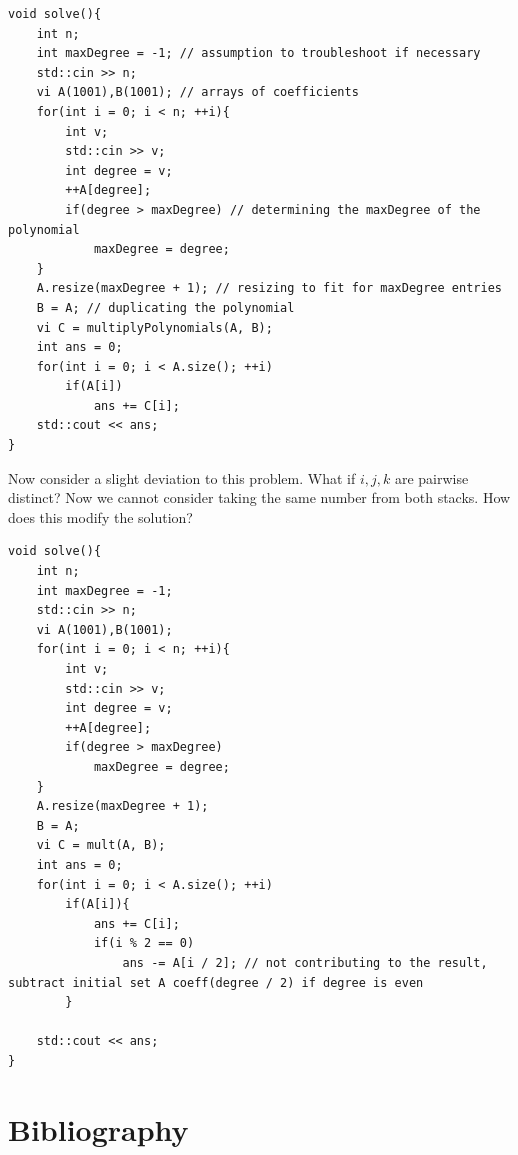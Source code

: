 \documentclass[letterpaper]{article}
\begin{document}
\begin{lstlisting}
void solve(){
    int n;
    int maxDegree = -1; // assumption to troubleshoot if necessary
    std::cin >> n;
    vi A(1001),B(1001); // arrays of coefficients
    for(int i = 0; i < n; ++i){
        int v;
        std::cin >> v;
        int degree = v;
        ++A[degree];
        if(degree > maxDegree) // determining the maxDegree of the polynomial
            maxDegree = degree;
    }
    A.resize(maxDegree + 1); // resizing to fit for maxDegree entries
    B = A; // duplicating the polynomial
    vi C = multiplyPolynomials(A, B);
    int ans = 0;
    for(int i = 0; i < A.size(); ++i)
        if(A[i])
            ans += C[i];
    std::cout << ans;
}
\end{lstlisting}

Now consider a slight deviation to this problem. What if $i,j,k$ are pairwise distinct? Now we cannot consider taking the same number from both stacks. How does this modify the solution?

\begin{lstlisting}
void solve(){
    int n;
    int maxDegree = -1;
    std::cin >> n;
    vi A(1001),B(1001);
    for(int i = 0; i < n; ++i){
        int v;
        std::cin >> v;
        int degree = v;
        ++A[degree];
        if(degree > maxDegree)
            maxDegree = degree;
    }
    A.resize(maxDegree + 1);
    B = A;
    vi C = mult(A, B);
    int ans = 0;
    for(int i = 0; i < A.size(); ++i)
        if(A[i]){
            ans += C[i];
            if(i % 2 == 0)
                ans -= A[i / 2]; // not contributing to the result, subtract initial set A coeff(degree / 2) if degree is even
        }

    std::cout << ans;
}
\end{lstlisting}

\newpage

\section{Bibliography}
\end{document}
